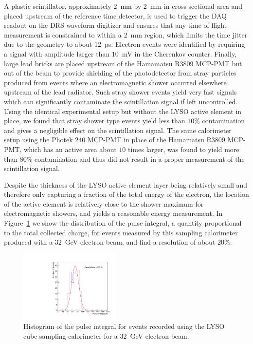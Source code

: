 \documentclass[12pt]{article}
\begin{document}
A plastic scintillator, approximately $2$~mm by $2$~mm in cross sectional area
and placed upstream of the reference time detector, is used to trigger
the DAQ readout on the DRS waveform digitizer and ensures that any
time of flight measurement is constrained to within a $2$~mm region,
which limits the time jitter due to the geometry to about $12$~ps. 
Electron events were identified by requiring a signal with amplitude
larger than $10$~mV in the Cherenkov counter.
Finally, large lead bricks are placed upstream of the Hamamatsu
R3809 MCP-PMT but out of the beam to provide shielding of the photodetector
from stray particles produced from events where an electromagnetic shower
occurred elsewhere upstream of the lead radiator. Such stray shower
events yield very fast signals which can significantly contaminate the
scintillation signal if left uncontrolled. Using the identical
experimental setup but without the LYSO active element in place,
we found that stray shower type events yield less than $10\%$ contamination
and gives a negligible effect on the scintillation signal. The same calorimeter
setup using the Photek 240 MCP-PMT in place of the Hamamatsu R3809 MCP-PMT,
which has an active area about $10$ times larger, was found to yield 
more than $80\%$ contamination and thus did not result in a proper
measurement of the scintillation signal.

Despite the thickness of the LYSO active element layer being relatively
small and therefore only capturing a fraction of the total energy
of the electron, the location of the active element is relatively close to the
shower maximum for electromagnetic showers, and yields
a reasonable energy measurement. In Figure~\ref{fig:LYSOCubeEnergy32GeV}
we show the distribution of the pulse integral, a quantity
proportional to the total collected charge, for events
measured by this sampling calorimeter produced with a
$32$~GeV electron beam, and find a resolution of about $20\%$.


\begin{figure}[h] \centering
\includegraphics[width=0.45\textwidth]{figs/TOF_Electron_LYSOCube_32GeV_energy} 
\caption{ Histogram of the pulse integral for events recorded using
the LYSO cube sampling calorimeter for a $32$~GeV electron beam. } 
\label{fig:LYSOCubeEnergy32GeV}
\end{figure}
\end{document}
